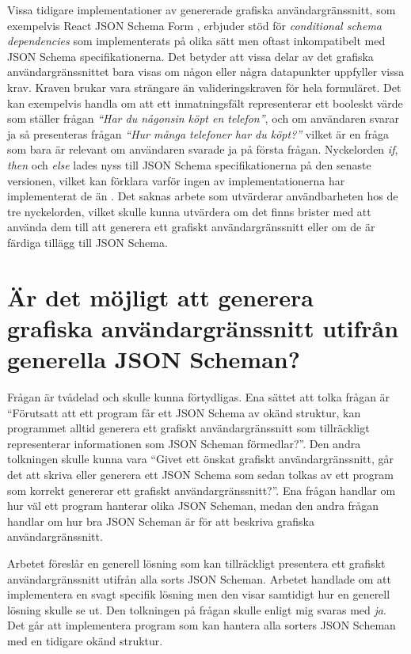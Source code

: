 Vissa tidigare implementationer av genererade grafiska användargränssnitt, som exempelvis React JSON Schema Form \cite{MozillaServices}, erbjuder stöd för \textit{conditional schema dependencies} som implementerats på olika sätt men oftast inkompatibelt med JSON Schema specifikationerna. Det betyder att vissa delar av det grafiska användargränssnittet bara visas om någon eller några datapunkter uppfyller vissa krav. Kraven brukar vara strängare än valideringskraven för hela formuläret. Det kan exempelvis handla om att ett inmatningsfält representerar ett booleskt värde som ställer frågan \textit{``Har du någonsin köpt en telefon''}, och om användaren svarar ja så presenteras frågan \textit{``Hur många telefoner har du köpt?''} vilket är en fråga som bara är relevant om användaren svarade ja på första frågan. Nyckelorden \textit{if}, \textit{then} och \textit{else} lades nyss till JSON Schema specifikationerna på den senaste versionen, vilket kan förklara varför ingen av implementationerna har implementerat de än \cite{Andrews2018}. Det saknas arbete som utvärderar användbarheten hos de tre nyckelorden, vilket skulle kunna utvärdera om det finns brister med att använda dem till att generera ett grafiskt användargränssnitt eller om de är färdiga tillägg till JSON Schema.

\section{Är det möjligt att generera grafiska användargränssnitt utifrån generella JSON Scheman?}
\label{sec:slutsats:generera}
Frågan är tvådelad och skulle kunna förtydligas. Ena sättet att tolka frågan är ``Förutsatt att ett program får ett JSON Schema av okänd struktur, kan programmet alltid generera ett grafiskt användargränssnitt som tillräckligt representerar informationen som JSON Scheman förmedlar?''. Den andra tolkningen skulle kunna vara ``Givet ett önskat grafiskt användargränssnitt, går det att skriva eller generera ett JSON Schema som sedan tolkas av ett program som korrekt genererar ett grafiskt användargränssnitt?''. Ena frågan handlar om hur väl ett program hanterar olika JSON Scheman, medan den andra frågan handlar om hur bra JSON Scheman är för att beskriva grafiska användargränssnitt.

Arbetet föreslår en generell lösning som kan tillräckligt presentera ett grafiskt användargränssnitt utifrån alla sorts JSON Scheman. Arbetet handlade om att implementera en svagt specifik lösning men den visar samtidigt hur en generell lösning skulle se ut. Den tolkningen på frågan skulle enligt mig svaras med \textit{ja}. Det går att implementera program som kan hantera alla sorters JSON Scheman med en tidigare okänd struktur.

